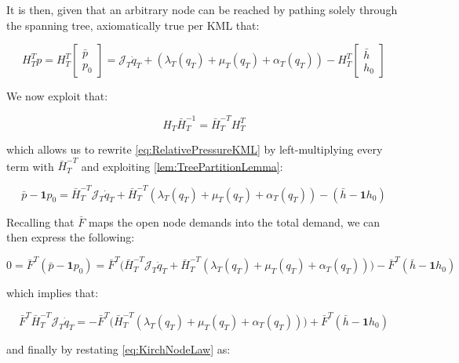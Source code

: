 It is then, given that an arbitrary node can be reached by pathing solely through the spanning tree, axiomatically true per KML that:

\begin{equation}\label{eq:RelativePressureKML}
	H_T^T p = 
	H_T^T \begin{bmatrix} \bar{p} \\ p_0	\end{bmatrix} =
	\mathcal{J}_T\dot{q}_T + (\lambda_T(q_T)+\mu_T(q_T) + \alpha_T(q_T)) - 
	H_T^T \begin{bmatrix} \bar{h} \\ h_0	\end{bmatrix}
\end{equation}

We now exploit that:

\begin{equation}\label{eq:TreeLemmaRewrite}
	H_T\bar{H}_T^{-1} = \bar{H}_T^{-T}H_T^T 
\end{equation}

which allows us to rewrite \cref{eq:RelativePressureKML} by left-multiplying every term with $\bar{H}_T^{-T}$ and exploiting \cref{lem:TreePartitionLemma}:

\begin{equation}\label{eq:RelativePressureKMLWithLemma}
	\bar{p} - \mathbf{1}p_0 =
	\bar{H}_T^{-T}\mathcal{J}_T\dot{q}_T + \bar{H}_T^{-T}(\lambda_T(q_T)+\mu_T(q_T) + \alpha_T(q_T)) - 
	(\bar{h} - \mathbf{1}h_0)
\end{equation}

Recalling that $\bar{F}$ maps the open node demands into the total demand, we can then express the following:

\begin{equation}\label{eq:RelativePressureLemmaAtmospheric}
	0 = \bar{F}^T(\bar{p} - \mathbf{1}p_0) =
	\bar{F}^T\Big(\bar{H}_T^{-T}\mathcal{J}_T\dot{q}_T + \bar{H}_T^{-T}(\lambda_T(q_T)+\mu_T(q_T) + \alpha_T(q_T))\Big) - 
	\bar{F}^T(\bar{h} - \mathbf{1}h_0)
\end{equation}

which implies that: 

\begin{equation}\label{eq:RelativePressureLemmaDiffEqForm}
	\bar{F}^T\bar{H}_T^{-T}\mathcal{J}_T\dot{q}_T = - \bar{F}^T\Big(\bar{H}_T^{-T}(\lambda_T(q_T)+\mu_T(q_T) + \alpha_T(q_T))\Big) + 
	\bar{F}^T(\bar{h} - \mathbf{1}h_0)
\end{equation}

and finally by restating \cref{eq:KirchNodeLaw} as:

